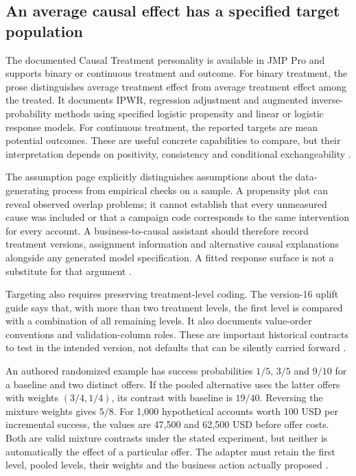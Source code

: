 \subsection{An average causal effect has a specified target population}
The documented Causal Treatment personality is available in JMP Pro and
supports binary or continuous treatment and outcome. For binary treatment,
the prose distinguishes average treatment effect from average treatment
effect among the treated. It documents IPWR, regression adjustment and
augmented inverse-probability methods using specified logistic propensity
and linear or logistic response models. For continuous treatment, the
reported targets are mean potential outcomes. These are useful concrete
capabilities to compare, but their interpretation depends on positivity,
consistency and conditional exchangeability
\citep{exec13_ch_jmp_causal}.

The assumption page explicitly distinguishes assumptions about the
data-generating process from empirical checks on a sample. A propensity
plot can reveal observed overlap problems; it cannot establish that every
unmeasured cause was included or that a campaign code corresponds to the
same intervention for every account. A business-to-causal assistant should
therefore record treatment versions, assignment information and alternative
causal explanations alongside any generated model specification. A fitted
response surface is not a substitute for that argument
\citep{exec13_ch_jmp_causal,exec24_jmp_choice}.

Targeting also requires preserving treatment-level coding. The version-16
uplift guide says that, with more than two treatment levels, the first
level is compared with a combination of all remaining levels. It also
documents value-order conventions and validation-column roles. These are
important historical contracts to test in the intended version, not
defaults that can be silently carried forward
\citep{exec13_ch_jmp_uplift}.

An authored randomized example has success probabilities $1/5$, $3/5$
and $9/10$ for a baseline and two distinct offers. If the pooled alternative
uses the latter offers with weights $(3/4,1/4)$, its contrast with baseline
is $19/40$. Reversing the mixture weights gives $5/8$. For 1,000
hypothetical accounts worth 100 USD per incremental success, the values
are 47,500 and 62,500 USD before offer costs. Both are valid mixture
contrasts under the stated experiment, but neither is automatically the
effect of a particular offer. The adapter must retain the first level,
pooled levels, their weights and the business action actually proposed
\citep{exec24_jmp_choice}.

